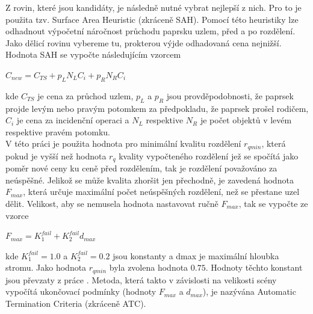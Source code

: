 \documentclass[report,11pt]{elsarticle}
\begin{document}
Z rovin, které jsou kandidáty, je následně nutné vybrat nejlepší z nich. Pro to je použita tzv. Surface Area Heuristic (zkráceně SAH). Pomocí této heuristiky lze odhadnout výpočetní náročnost průchodu paprsku uzlem, před a po rozdělení. Jako dělicí rovinu vybereme tu, prokterou výjde odhadovaná cena nejnižší. Hodnota SAH se vypočte následujícím vzorcem\\
\begin{center}
$C_{new}=C_{TS}+p_LN_LC_i+p_RN_RC_i$
\end{center}
kde $C_{TS}$ je cena za průchod uzlem, $p_L$ a $p_R$ jsou provděpodobnosti, že paprsek projde levým nebo pravým potomkem za předpokladu, že paprsek prošel rodičem, $C_i$ je cena za incidenční operaci a $N_L$ respektive $N_R$ je počet objektů v levém respektive pravém potomku.\\
V této práci je použita hodnota pro minimální kvalitu rozdělení $r_{qmin}$, která pokud je vyšší než hodnota $r_q$ kvality vypočteného rozdělení jež se spočítá jako poměr nové ceny ku ceně před rozdělením, tak je rozdělení považováno za neúspěšné.  Jelikož se může kvalita zhoršit jen přechodně, je zavedená hodnota $F_{max}$, která určuje maximální počet neúspěšných rozdělení, než se přestane uzel dělit. Velikost, aby se nemusela hodnota nastavovat ručně $F_{max}$, tak se vypočte ze vzorce\\
\begin{center}
$F_{max}=K_1^{fail}+K_2^{fail}d_{max}$
\end{center}
kde $K_1^{fail}=1.0$ a $K_2^{fail}=0.2$ jsou konstanty a dmax je maximální hloubka stromu. Jako hodnota $r_{qmin}$ byla zvolena hodnota $0.75$. Hodnoty těchto konstant jsou převzaty z práce \cite{BittnerHavran}. Metoda, která takto v závislosti na velikosti scény vypočítá ukončovací podmínky (hodnoty $F_{max}$ a $d_{max}$), je nazývána Automatic Termination Criteria (zkráceně ATC).\\
\end{document}
